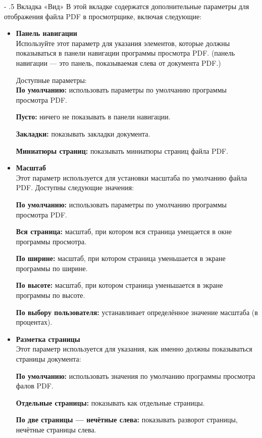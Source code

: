 ﻿\documentclass[a4paper,10pt]{article}
\makeatletter
\renewcommand\paragraph{%
   \@startsection{paragraph}{4}{0mm}%
      {-\baselineskip}%
      {.5\baselineskip}%
      {\normalfont\normalsize\bfseries}}
\makeatother
\begin{document}
\paragraph{Вкладка «Вид»}
В этой вкладке содержатся дополнительные параметры для отображения файла PDF в просмотрщике, включая следующие:
\begin{itemize}
 \item \textbf{Панель навигации}\\
 Используйте этот параметр для указания элементов, которые должны показываться в панели навигации программы просмотра PDF. (панель навигации — это панель, показываемая слева от документа PDF.)
 
 Доступные параметры:\\
 \textbf{По умолчанию:} использовать параметры по умолчанию программы просмотра PDF.
 
 \textbf{Пусто:} ничего не показывать в панели навигации.
 
 \textbf{Закладки:} показывать закладки документа.
 
 \textbf{Миниатюры страниц:} показывать миниатюры страниц файла PDF.
 \item \textbf{Масштаб}\\
 Этот параметр используется для установки масштаба по умолчанию файла PDF. Доступны следующие значения:
 
 \textbf{По умолчанию:} использовать параметры по умолчанию программы просмотра PDF.
 
 \textbf{Вся страница:} масштаб, при котором вся страница умещается в окне программы просмотра.
 
 \textbf{По ширине:} масштаб, при котором страница уменьшается в экране программы по ширине.
 
 \textbf{По высоте:} масштаб, при котором страница уменьшается в экране программы по высоте.
 
 \textbf{По выбору пользователя:} устанавливает определённое значение масштаба (в процентах).
 \item \textbf{Разметка страницы}\\
 Этот параметр используется для указания, как именно должны показываться страницы документа:
 
 \textbf{По умолчанию:} использовать значения по умолчанию программы просмотра фалов PDF.
 
 \textbf{Отдельные страницы:} показывать как отдельные страницы.
 
 \textbf{По две страницы — нечётные слева:} показывать разворот страницы, нечётные страницы слева.
 

\end{itemize}
\end{document}
